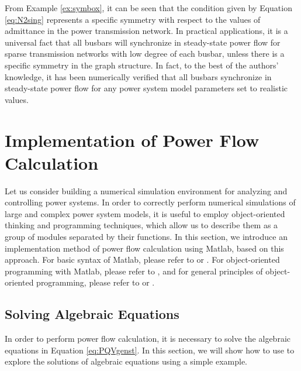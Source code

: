 \documentclass[graybox, envcountchap]{svmult}
\begin{document}
From Example \ref{ex:symbox}, it can be seen that the condition given by
Equation \ref{eq:N2sing} represents a specific symmetry with respect to the
values of admittance in the power transmission network. In practical
applications, it is a universal fact that all busbars will synchronize in
steady-state power flow for sparse transmission networks with low degree of each
busbar, unless there is a specific symmetry in the graph structure. In fact, to
the best of the authors' knowledge, it has been numerically verified that all
busbars synchronize in steady-state power flow for any power system model
parameters set to realistic values.

\section{Implementation of Power Flow Calculation}\label{sec:powfcal}

Let us consider building a numerical simulation environment for analyzing and
controlling power systems. In order to correctly perform numerical simulations
of large and complex power system models, it is useful to employ object-oriented
thinking and programming techniques, which allow us to describe them as a group
of modules separated by their functions. In this section, we introduce an
implementation method of power flow calculation using Matlab, based on this
approach. For basic syntax of Matlab, please refer to \cite{Kamisaka2011} or
\cite{Kitamura2016}. For object-oriented programming with Matlab, please refer
to \cite{Kobayashi2020}, and for general principles of object-oriented
programming, please refer to \cite{Hirasawa2021} or \cite{Sandi_Metz2016}.

\subsection{Solving Algebraic Equations}
In order to perform power flow calculation, it is necessary to solve the
algebraic equations in Equation \ref{eq:PQVgenst}. In this section, we will show
how to use \matlab to explore the solutions of algebraic equations using a simple
example.
\end{document}
